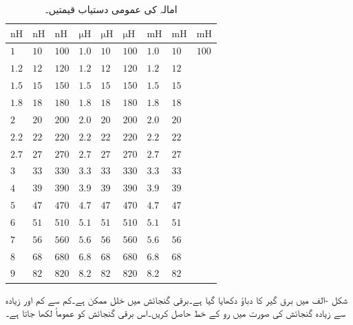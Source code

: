 \begin{table}\caption{امالہ کی عمومی دستیاب قیمتیں۔}
\centering
\begin{tabular}{lllllllll}
$\si{\nano\henry}$ & $\si{\nano\henry}$ &$\si{\nano\henry}$ &$\si{\micro\henry}$ &$\si{\micro\henry}$ &$\si{\micro\henry}$ &$\si{\milli\henry}$ &$\si{\milli\henry}$ &$\si{\milli\henry}$ \\
\hline
$1$ & $10$ &$100$ & $1.0$ & $10$ &$100$ & $1.0$ & $10$ & $100$ \\
$1.2$ & $12$ &$120$ & $1.2$ & $12$ &$120$ & $1.2$ & $12$ &  \\
$1.5$ & $15$ &$150$ & $1.5$ & $15$ &$150$ & $1.5$ & $15$ &  \\
$1.8$ & $18$ &$180$ & $1.8$ & $18$ &$180$ & $1.8$ & $18$ &  \\
$2$ & $20$ &$200$ & $2.0$ & $20$ &$200$ & $2.0$ & $20$ &  \\
$2.2$ & $22$ &$220$ & $2.2$ & $22$ &$220$ & $2.2$ & $22$ &  \\
$2.7$ & $27$ &$270$ & $2.7$ & $27$ &$270$ & $2.7$ & $27$ &  \\
$3$ & $33$ &$330$ & $3.3$ & $33$ &$330$ & $3.3$ & $33$ &  \\
$4$ & $39$ &$390$ & $3.9$ & $39$ &$390$ & $3.9$ & $39$ &  \\
$5$ & $47$ &$470$ & $4.7$ & $47$ &$470$ & $4.7$ & $47$ &  \\
$6$ & $51$ &$510$ & $5.1$ & $51$ &$510$ & $5.1$ & $51$ &  \\
$7$ & $56$ &$560$ & $5.6$ & $56$ &$560$ & $5.6$ & $56$ &  \\
$8$ & $68$ &$680$ & $6.8$ & $68$ &$680$ & $6.8$ & $68$ &  \\
$9$ & $82$ &$820$ & $8.2$ & $82$ &$820$ & $8.2$ & $82$ &  
\end{tabular}
\label{جدول_امالہ_امالہ_عمومی_دستیاب_قیمتیں}
\end{table}

شکل -الف میں  برق گیر کا دباؤ دکھایا گیا ہے۔برقی گنجائش میں خلل  ممکن ہے۔کم سے کم اور زیادہ سے زیادہ گنجائش کی صورت میں رو کے خط حاصل کریں۔اس برقی گنجائش کو عموماً  لکھا جاتا ہے۔

